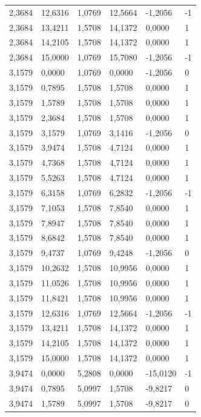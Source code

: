 \documentclass[12pt]{article}
\begin{document}
\begin{longtable}{@{}llllll@{}}
		2,3684  & 12,6316 & 1,0769  & 12,5664 & -1,2056  & -1 \\
		2,3684  & 13,4211 & 1,5708  & 14,1372 & 0,0000   & 1  \\
		2,3684  & 14,2105 & 1,5708  & 14,1372 & 0,0000   & 1  \\
		2,3684  & 15,0000 & 1,0769  & 15,7080 & -1,2056  & -1 \\
		3,1579  & 0,0000  & 1,0769  & 0,0000  & -1,2056  & 0  \\
		3,1579  & 0,7895  & 1,5708  & 1,5708  & 0,0000   & 1  \\
		3,1579  & 1,5789  & 1,5708  & 1,5708  & 0,0000   & 1  \\
		3,1579  & 2,3684  & 1,5708  & 1,5708  & 0,0000   & 1  \\
		3,1579  & 3,1579  & 1,0769  & 3,1416  & -1,2056  & 0  \\
		3,1579  & 3,9474  & 1,5708  & 4,7124  & 0,0000   & 1  \\
		3,1579  & 4,7368  & 1,5708  & 4,7124  & 0,0000   & 1  \\
		3,1579  & 5,5263  & 1,5708  & 4,7124  & 0,0000   & 1  \\
		3,1579  & 6,3158  & 1,0769  & 6,2832  & -1,2056  & -1 \\
		3,1579  & 7,1053  & 1,5708  & 7,8540  & 0,0000   & 1  \\
		3,1579  & 7,8947  & 1,5708  & 7,8540  & 0,0000   & 1  \\
		3,1579  & 8,6842  & 1,5708  & 7,8540  & 0,0000   & 1  \\
		3,1579  & 9,4737  & 1,0769  & 9,4248  & -1,2056  & 0  \\
		3,1579  & 10,2632 & 1,5708  & 10,9956 & 0,0000   & 1  \\
		3,1579  & 11,0526 & 1,5708  & 10,9956 & 0,0000   & 1  \\
		3,1579  & 11,8421 & 1,5708  & 10,9956 & 0,0000   & 1  \\
		3,1579  & 12,6316 & 1,0769  & 12,5664 & -1,2056  & -1 \\
		3,1579  & 13,4211 & 1,5708  & 14,1372 & 0,0000   & 1  \\
		3,1579  & 14,2105 & 1,5708  & 14,1372 & 0,0000   & 1  \\
		3,1579  & 15,0000 & 1,5708  & 14,1372 & 0,0000   & 1  \\
		3,9474  & 0,0000  & 5,2808  & 0,0000  & -15,0120 & -1 \\
		3,9474  & 0,7895  & 5,0997  & 1,5708  & -9,8217  & 0  \\
		3,9474  & 1,5789  & 5,0997  & 1,5708  & -9,8217  & 0  \\

\end{longtable}
\end{document}
